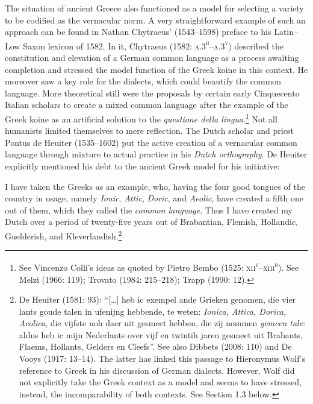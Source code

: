 \begin{styleStandard}
The situation of ancient Greece also functioned as a model for selecting a variety to be codified as the vernacular norm. A very straightforward example of such an approach can be found in Nathan Chytraeus’ (1543–1598) preface to his Latin–Low Saxon lexicon of 1582. In it, Chytraeus (1582: \textsc{a.3}\textsc{\textsuperscript{r}}\textsc{–a.3}\textsc{\textsuperscript{v}}) described the constitution and elevation of a German common language as a process awaiting completion and stressed the model function of the Greek koine in this context. He moreover saw a key role for the dialects, which could beautify the common language. More theoretical still were the proposals by certain early Cinquecento Italian scholars to create a mixed common language after the example of the Greek koine as an artificial solution to the \textit{questione della lingua}.\footnote{ See Vincenzo Colli’s ideas as quoted by Pietro Bembo (1525: \textsc{xii}\textsc{\textsuperscript{v}}\textsc{–xiii}\textsc{\textsuperscript{r}}). See Melzi (1966: 119); Trovato (1984: 215–218); Trapp (1990: 12).} Not all humanists limited themselves to mere reflection. The Dutch scholar and priest Pontus de Heuiter (1535–1602) put the active creation of a vernacular common language through mixture to actual practice in his \textit{Dutch orthography}. De Heuiter explicitly mentioned his debt to the ancient Greek model for his initiative:
\end{styleStandard}

\begin{styleQuote}
I have taken the Greeks as an example, who, having the four good tongues of the country in usage, namely \textit{Ionic}, \textit{Attic}, \textit{Doric}, and \textit{Aeolic}, have created a fifth one out of them, which they called the \textit{common language}. Thus I have created my Dutch over a period of twenty-five years out of Brabantian, Flemish, Hollandic, Guelderish, and Kleverlandish.\footnote{ De Heuiter (1581: 93): “[…] heb ic exempel ande Grieken genomen, die vier lants goude talen in ufenijng hebbende, te weten: \textit{Ionica, Attica, Dorica, Aeolica}, die vijfste noh daer uit gesmeet hebben, die zij nommen \textit{gemeen tale}: aldus heb ic mijn Nederlants over vijf en twintih jaren gesmeet uit Brabants, Flaems, Hollants, Gelders en Cleefs”. See also Dibbets (2008: 110) and De Vooys (1917: 13–14). The latter has linked this passage to Hieronymus Wolf’s reference to Greek in his discussion of German dialects. However, Wolf did not explicitly take the Greek context as a model and seems to have stressed, instead, the incomparability of both contexts. See Section 1.3 below.}
\end{styleQuote}

